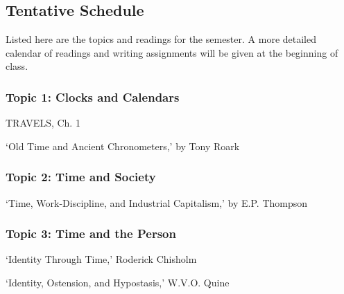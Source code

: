 \documentclass[oneside, 11pt]{article}
\begin{document}
\subsection*{Tentative Schedule}
Listed here are the topics and readings for the semester. A more detailed calendar of readings and writing assignments will be given at the beginning of class. 

\subsubsection*{Topic 1: Clocks and Calendars}
\begin{enumerate*}
\item TRAVELS, Ch. 1
\item `Old Time and Ancient Chronometers,' by Tony Roark
\end{enumerate*}

\subsubsection*{Topic 2: Time and Society}
\begin{enumerate*}
\item `Time, Work-Discipline, and Industrial Capitalism,' by E.P. Thompson
\end{enumerate*}

\subsubsection*{Topic 3: Time and the Person}
\begin{enumerate*}
\item  `Identity Through Time,' Roderick Chisholm
\item  `Identity, Ostension, and Hypostasis,' W.V.O. Quine
\end{enumerate*}

\end{document}

